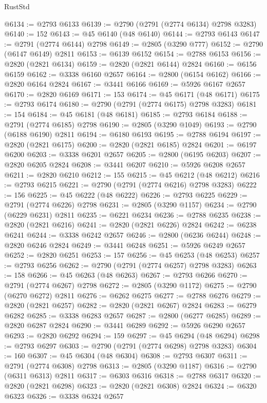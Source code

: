 \begin{lexlean}{RustStd}
\begin{coremodule}
@6134 := @2793 @6133
@6139 := @2790 (@2791 (@2774 @6134) @2798 @3283)
@6140 := 152
@6143 := @45 @6140 (@48 @6140)
@6144 := @2793 @6143
@6147 := @2791 (@2774 @6144) @2798
@6149 := @2805 (@3290 @777)
@6152 := @2790 (@6147 @6149) @2811
@6153 := @6139 @6152
@6154 := @2788 @6153
@6156 := @2820 (@2821 @6134)
@6159 := @2820 (@2821 @6144) @2824
@6160 := @6156 @6159
@6162 := @3338 @6160 @2657
@6164 := @2800 (@6154 @6162)
@6166 := @2820 @6164 @2824
@6167 := @3441 @6166
@6169 := @5926 @6167 @2657
@6170 := @2820 @6169
@6171 := 153
@6174 := @45 @6171 (@48 @6171)
@6175 := @2793 @6174
@6180 := @2790 (@2791 (@2774 @6175) @2798 @3283)
@6181 := 154
@6184 := @45 @6181 (@48 @6181)
@6185 := @2793 @6184
@6188 := @2791 (@2774 @6185) @2798
@6190 := @2805 (@3290 @1049)
@6193 := @2790 (@6188 @6190) @2811
@6194 := @6180 @6193
@6195 := @2788 @6194
@6197 := @2820 (@2821 @6175)
@6200 := @2820 (@2821 @6185) @2824
@6201 := @6197 @6200
@6203 := @3338 @6201 @2657
@6205 := @2800 (@6195 @6203)
@6207 := @2820 @6205 @2824
@6208 := @3441 @6207
@6210 := @5926 @6208 @2657
@6211 := @2820 @6210
@6212 := 155
@6215 := @45 @6212 (@48 @6212)
@6216 := @2793 @6215
@6221 := @2790 (@2791 (@2774 @6216) @2798 @3283)
@6222 := 156
@6225 := @45 @6222 (@48 @6222)
@6226 := @2793 @6225
@6229 := @2791 (@2774 @6226) @2798
@6231 := @2805 (@3290 @1157)
@6234 := @2790 (@6229 @6231) @2811
@6235 := @6221 @6234
@6236 := @2788 @6235
@6238 := @2820 (@2821 @6216)
@6241 := @2820 (@2821 @6226) @2824
@6242 := @6238 @6241
@6244 := @3338 @6242 @2657
@6246 := @2800 (@6236 @6244)
@6248 := @2820 @6246 @2824
@6249 := @3441 @6248
@6251 := @5926 @6249 @2657
@6252 := @2820 @6251
@6253 := 157
@6256 := @45 @6253 (@48 @6253)
@6257 := @2793 @6256
@6262 := @2790 (@2791 (@2774 @6257) @2798 @3283)
@6263 := 158
@6266 := @45 @6263 (@48 @6263)
@6267 := @2793 @6266
@6270 := @2791 (@2774 @6267) @2798
@6272 := @2805 (@3290 @1172)
@6275 := @2790 (@6270 @6272) @2811
@6276 := @6262 @6275
@6277 := @2788 @6276
@6279 := @2820 (@2821 @6257)
@6282 := @2820 (@2821 @6267) @2824
@6283 := @6279 @6282
@6285 := @3338 @6283 @2657
@6287 := @2800 (@6277 @6285)
@6289 := @2820 @6287 @2824
@6290 := @3441 @6289
@6292 := @5926 @6290 @2657
@6293 := @2820 @6292
@6294 := 159
@6297 := @45 @6294 (@48 @6294)
@6298 := @2793 @6297
@6303 := @2790 (@2791 (@2774 @6298) @2798 @3283)
@6304 := 160
@6307 := @45 @6304 (@48 @6304)
@6308 := @2793 @6307
@6311 := @2791 (@2774 @6308) @2798
@6313 := @2805 (@3290 @1187)
@6316 := @2790 (@6311 @6313) @2811
@6317 := @6303 @6316
@6318 := @2788 @6317
@6320 := @2820 (@2821 @6298)
@6323 := @2820 (@2821 @6308) @2824
@6324 := @6320 @6323
@6326 := @3338 @6324 @2657

\end{coremodule}
\end{lexlean}
